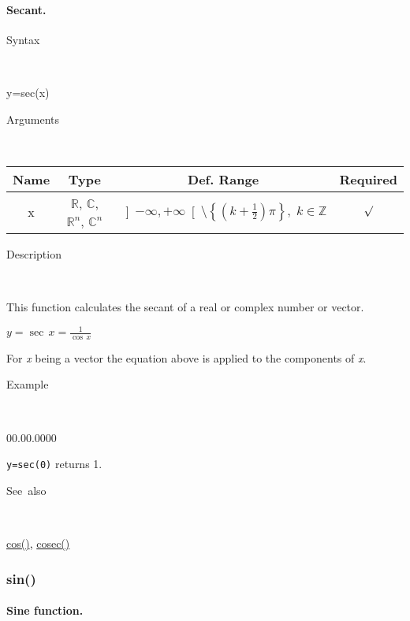 \paragraph{\label{par:Secant}Secant.}

\begin{description}
\item [Syntax]~
\end{description}
y=sec(x)

\begin{description}
\item [Arguments]~
\end{description}
\begin{tabular}{|c|c|c|c|}
\hline 
Name&
Type&
Def. Range&
Required\tabularnewline
\hline
\hline 
x&
$\mathbb{R}$, $\mathbb{C}$, $\mathbb{R}^{n}$, $\mathbb{C}^{n}$&
$\left]-\infty,+\infty\right[\setminus\left\{ \left(k+\frac{1}{2}\right)\pi\right\} ,\; k\in\mathbb{Z}$&
$\surd$\tabularnewline
\hline
\end{tabular}

\begin{description}
\item [Description]~
\end{description}
This function calculates the secant of a real or complex number or
vector.

\medskip{}
$y=$$\sec\, x$$={\displaystyle \frac{1}{\cos\, x}}$
\medskip{}

For \textit{x} being a vector the equation above is applied
to the components of \textit{x}.

\begin{description}
\item [Example]~
\end{description}
\begin{lyxlist}{00.00.0000}
\item [\texttt{y=sec(0)}]returns 1.
\end{lyxlist}
\begin{description}
\item [See~also]~
\end{description}
\textcolor{blue}{\hyperlink{cos}{cos()}}\textcolor{black}{,} \textcolor{blue}{\hyperlink{cosec}{cosec()}}


\newpage
\subsubsection*{\hypertarget{sin}{}{\Large sin()}}


\paragraph{\label{par:Sine}Sine function.}

